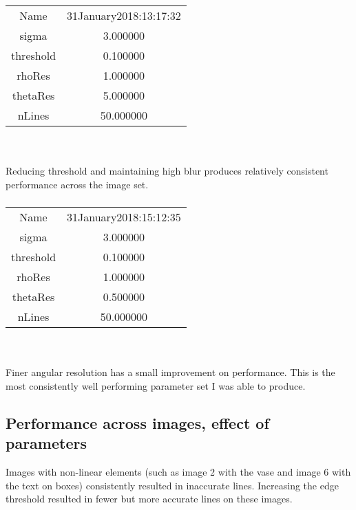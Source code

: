 \documentclass[12pt]{article}
\begin{document}
\subsubsection{}
\begin{tabular} { c c }
Name & 31January2018:13:17:32\\
sigma & 3.000000\\
threshold & 0.100000\\
rhoRes & 1.000000\\
thetaRes & 5.000000\\
nLines & 50.000000
\end{tabular}
\\ \\
Reducing threshold and maintaining high blur produces relatively consistent performance across the image set.

\subsubsection{}
\begin{tabular} { c c }
Name & 31January2018:15:12:35\\
sigma & 3.000000\\
threshold & 0.100000\\
rhoRes & 1.000000\\
thetaRes & 0.500000\\
nLines & 50.000000
\end{tabular}
\\ \\
Finer angular resolution has a small improvement on performance. This is the most consistently well performing parameter set I was able to produce.

\newpage
\subsection{Performance across images, effect of parameters}
Images with non-linear elements (such as image 2 with the vase and image 6 with the text on boxes) consistently resulted in inaccurate lines. Increasing the edge threshold resulted in fewer but more accurate lines on these images.
\end{document}
